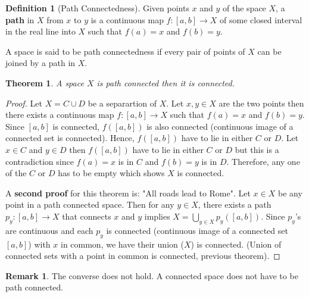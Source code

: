 \documentclass[12pt,reqno]{amsart}
\theoremstyle{plain}
\newtheorem{thm}{Theorem}
\theoremstyle{definition}
\newtheorem{defn}{Definition}
\newtheorem{rem}{Remark}
\begin{document}
\begin{defn}[Path Connectedness]
    Given points $x$ and $y$ of the space $X$, a {\bf path} in $X$ from $x$ to $y$ is a continuous map $f \colon [a,b] \to X$ of some closed interval in the real line into $X$ such that $f(a) = x$ and $f(b) = y$.

    A space is said to be path connectedness if every pair of points of $X$ can be joined by a path in $X$.
\end{defn}
\begin{thm}
    A space $X$ is path connected then it is connected.
\end{thm}
\begin{proof}
    Let $X = C \cup D$ be a separartion of $X$. Let $x,y \in X$ are the two points then there exists a continuous map $f\colon [a,b] \to X$ such that $f(a) = x$ and $f(b) = y$. Since $[a,b]$ is connected, $f([a,b])$ is also connected (continuous image of a connected set is connected). Hence, $f([a,b])$ have to lie in either $C$ or $D$. Let $x \in C$ and $y \in D$ then $f([a,b])$ have to lie in either $C$ or $D$ but this is a contradiction since $f(a) = x$ is in $C$ and $f(b) = y$ is in $D$. Therefore, any one of the $C$ or $D$ has to be empty which shows $X$ is connected.

    A {\bf second proof} for this theorem is: "All roads lead to Rome". Let $x \in X$ be any point in a path connected space. Then for any $y \in X$, there exists a path $p_y \colon [a,b] \to X$ that connects $x$ and $y$ implies $X = \bigcup_{y \in X} p_y([a,b])$. Since $p_y$'s are continuous and each $p_y$ is connected (continuous image of a connected set $[a,b]$) with $x$ in common, we have their union ($X$) is connected. (Union of connected sets with a point in common is connected, previous theorem).
\end{proof}

\begin{rem}
    The converse does not hold. A connected space does not have to be path connected.
\end{rem}
\end{document}
